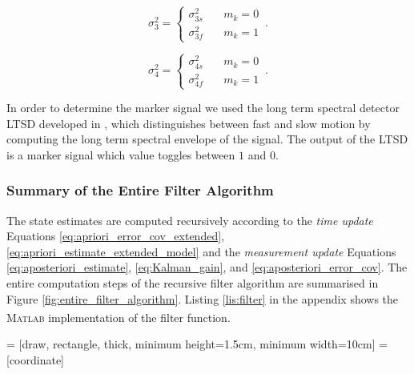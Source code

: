 \begin{equation}
  \sigma^2_3 = \begin{cases}
  	\sigma^2_{3s} & \quad m_k = 0 \\
  	\sigma^2_{3f} & \quad m_k = 1
  \end{cases}\,.
\end{equation}

\begin{equation}
  \sigma^2_4 = \begin{cases}
  	\sigma^2_{4s} & \quad m_k = 0 \\
  	\sigma^2_{4f} & \quad m_k = 1
  \end{cases}\,.
\end{equation}

\noindent
In order to determine the marker signal we used the long term spectral detector \gls{LTSD} developed in \cite{olivares_vicente_gaitwatch_2013}, which distinguishes between fast and slow motion by computing the long term spectral envelope of the signal. The output of the LTSD is a marker signal which value toggles between $1$ and $0$.

\subsubsection{Summary of the Entire Filter Algorithm}

The state estimates are computed recursively according to the \emph{time update} Equations \ref{eq:apriori_error_cov_extended}, \ref{eq:apriori_estimate_extended_model} and the \emph{measurement update} Equations \ref{eq:aposteriori_estimate}, \ref{eq:Kalman_gain}, and \ref{eq:aposteriori_error_cov}. The entire computation steps of the recursive filter algorithm are summarised in Figure \ref{fig:entire_filter_algorithm}. Listing \ref{lis:filter} in the appendix shows the \textsc{Matlab}\textsuperscript{\textregistered} implementation of the filter function.

 = [draw, rectangle, thick, 
    minimum height=1.5cm, minimum width=10cm]
 = [coordinate]

